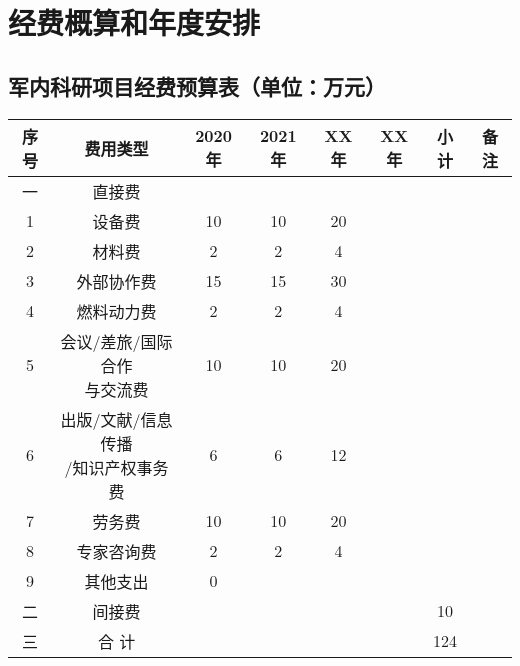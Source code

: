 


\section{经费概算和年度安排}


\subsection{军内科研项目经费预算表（单位：万元）}


\begin{tabular}{cccccccc}
	\toprule
	序号 & 费用类型                        & 2020年 & 2021年 & XX年 & XX年 & 小计 & 备注 \\
	\midrule
	一   & 直接费                                                                        \\
	1    & 设备费                          & 10     & 10     & 20                        \\
	2    & 材料费                          & 2      & 2      & 4                         \\
	3    & 外部协作费                      & 15     & 15     & 30                        \\
	4    & 燃料动力费                      & 2      & 2      & 4                         \\
	5    & \makecell[c]{会议/差旅/国际合作                                               \\与交流费}&	10&	10&	20	\\
	6    & \makecell[c]{出版/文献/信息传播                                               \\/知识产权事务费}&	6&	6&	12	\\
	7    & 劳务费                          & 10     & 10     & 20                        \\
	8    & 专家咨询费                      & 2      & 2      & 4                         \\
	9    & 其他支出                        & 0                                           \\
	二   & 间接费                          &        &        &      &      & 10          \\
	三   & 合 计                           &        &        &      &      & 124         \\
	\bottomrule
\end{tabular}




